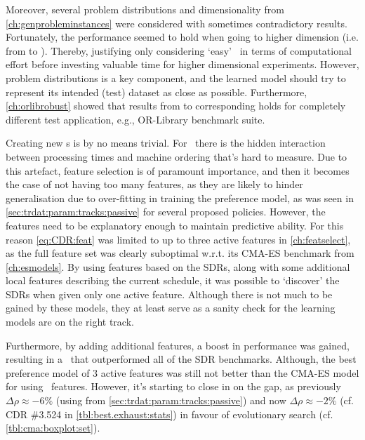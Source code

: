 Moreover, several problem distributions and dimensionality from 
\cref{ch:genprobleminstances} were considered with sometimes contradictory 
results. Fortunately, the performance seemed to hold when going to higher 
dimension (i.e. from \Problem[6\times5]{} to \Problem[10\times10]{}). 
Thereby, justifying only considering `easy' \JSP\ in terms of computational 
effort before investing valuable time for higher dimensional experiments. 
However, problem distributions is a key component, and the learned model should 
try to represent its intended (test) dataset as close as possible.
Furthermore, \cref{ch:orlibrobust} showed that results from \Problem{\train} to 
corresponding \Problem{\test} holds for completely different test application, 
e.g., OR-Library benchmark suite.

Creating new \dr s is by no means trivial. For \jsp\ there is 
the hidden interaction between processing times and machine ordering that's 
hard to measure.
Due to this artefact, feature selection is of paramount importance, and then it 
becomes the case of not having too many features, as they are likely to hinder 
generalisation due to over-fitting in training the preference model, as was 
seen in \cref{sec:trdat:param:tracks:passive} for several proposed policies. 
However, the features need to be explanatory enough to maintain predictive 
ability. 
For this reason \cref{eq:CDR:feat} was limited to up to three active features 
in \cref{ch:featselect}, as the full feature set was clearly suboptimal 
w.r.t. its CMA-ES benchmark from \cref{ch:esmodels}. 
By using features based on the SDRs, along with some additional local features 
describing the current schedule, it was possible to `discover' the SDRs when 
given only one active feature. 
Although there is not much to be gained by these models, they at least serve as 
a sanity check for the learning models are on the right track. 

Furthermore, by adding additional features, a boost in performance was 
gained, resulting in a \cdr\ that outperformed all of the SDR benchmarks. 
Although, the best preference model of 3 active features was still not better 
than the CMA-ES model for  using \NrFeatLocal\ features. 
However, it's starting to close in on the gap, as previously 
$\Delta\rho\approx-6\%$ (using  from 
\cref{sec:trdat:param:tracks:passive}) and now $\Delta\rho\approx-2\%$ (cf. 
CDR \#3.524 in \cref{tbl:best.exhaust:stats}) in favour of evolutionary 
search (cf. \cref{tbl:cma:boxplot:set}).

